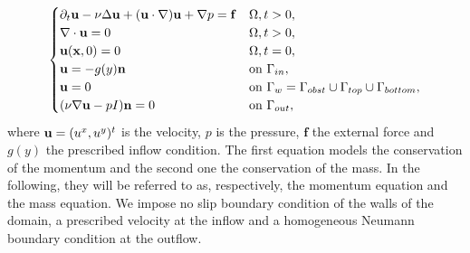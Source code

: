 \begin{equation}
\begin{cases}
\partial_t \b_u - \nu \Delta \b_u + (\b_u \cdot \nabla) \b_u + \nabla p = \mathbf{f}& \Omega, t > 0, \\
\nabla \cdot \b_u = 0 & \Omega, t>0, \\
\b_u (\mathbf{x}, 0) = 0 & \Omega, t=0, \\
\b_u = - g(y)\mathbf{n} & \text{on } \Gamma_{in}, \\
\b_u = 0 & \text{on } \Gamma_w = \Gamma_{obst} \cup \Gamma_{top} \cup \Gamma_{bottom}, \\
(\nu \nabla \b_u -pI) \mathbf{n} = 0 & \text{on } \Gamma_{out},
\end{cases}
\label{state}
\end{equation}
where $\b_u = (u^x, u^y)^t$ is the velocity, $p$ is the pressure, $\mathbf{f}$ the external force and $g(y)$ the prescribed inflow condition. The first equation models the conservation of the momentum and the second one the conservation of the mass. In the following, they will be referred to as, respectively, the momentum equation and the mass equation. We impose no slip boundary condition of the walls of the domain, a prescribed velocity at the inflow and a homogeneous Neumann boundary condition at the outflow. 


